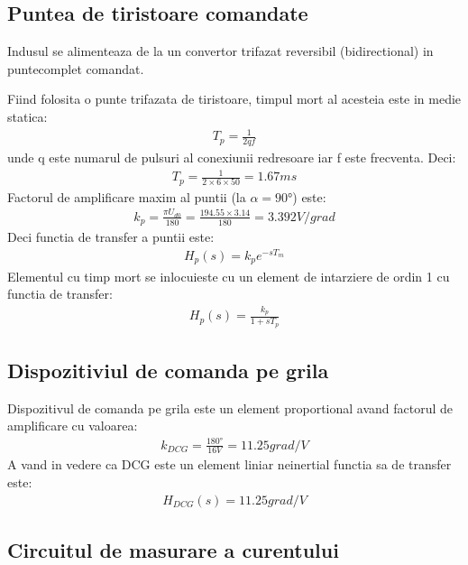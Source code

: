 \documentclass[11pt]{article}
\begin{document}
\subsection{Puntea de tiristoare comandate}
Indusul se alimenteaza de la un convertor trifazat reversibil (bidirectional) in puntecomplet comandat.

Fiind folosita o punte trifazata de tiristoare, timpul mort al acesteia este in medie statica:
\begin{align*}
T_p=\frac{1}{2qf}
\end{align*}
unde q este numarul de pulsuri al conexiunii redresoare iar f este frecventa.
Deci:
\begin{align*}
T_p=\frac{1}{2\times 6 \times 50}=1.67ms
\end{align*}
Factorul de amplificare maxim al puntii (la $\alpha = \ang{90}$) este:
\begin{align*}
k_p=\frac{\pi U_{d0}}{180}=\frac{194.55\times 3.14}{180}=3.392 V/grad
\end{align*}
Deci functia de transfer a puntii este:
\begin{align*}
H_p(s)=k_pe^{-sT_m}
\end{align*}
Elementul cu timp mort se inlocuieste cu un element de intarziere de ordin 1 cu functia de transfer:
\begin{align*}
H_p(s)=\frac{k_p}{1+sT_p}
\end{align*}
\subsection{Dispozitiviul de comanda pe grila}
Dispozitivul de comanda pe grila este un element proportional avand factorul de amplificare cu valoarea:
\begin{align*}
k_{DCG}=\frac{\ang{180}}{16V}=11.25 grad/V
\end{align*}
A vand in vedere ca DCG este un element liniar neinertial functia sa de transfer este:
\begin{align*}
H_{DCG}(s)=11.25 grad/V
\end{align*}
\subsection{Circuitul de masurare a curentului}

\newpage
\nocite{*}


\end{document}
